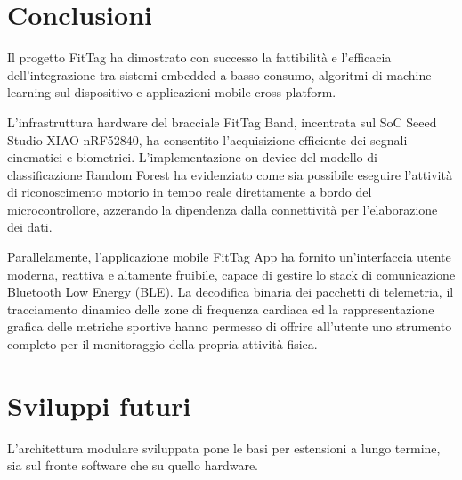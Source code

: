 \section{Conclusioni}
Il progetto FitTag ha dimostrato con successo la fattibilità e l'efficacia dell'integrazione tra sistemi embedded a basso consumo, algoritmi di machine learning sul dispositivo e applicazioni mobile cross-platform.

L'infrastruttura hardware del bracciale FitTag Band, incentrata sul SoC Seeed Studio XIAO nRF52840, ha consentito l'acquisizione efficiente dei segnali cinematici e biometrici. L'implementazione on-device del modello di classificazione Random Forest ha evidenziato come sia possibile eseguire l'attività di riconoscimento motorio in tempo reale direttamente a bordo del microcontrollore, azzerando la dipendenza dalla connettività per l'elaborazione dei dati.

Parallelamente, l'applicazione mobile FitTag App ha fornito un'interfaccia utente moderna, reattiva e altamente fruibile, capace di gestire lo stack di comunicazione Bluetooth Low Energy (BLE). La decodifica binaria dei pacchetti di telemetria, il tracciamento dinamico delle zone di frequenza cardiaca ed la rappresentazione grafica delle metriche sportive hanno permesso di offrire all'utente uno strumento completo per il monitoraggio della propria attività fisica.

\section{Sviluppi futuri}
L'architettura modulare sviluppata pone le basi per estensioni a lungo termine, sia sul fronte software che su quello hardware.

